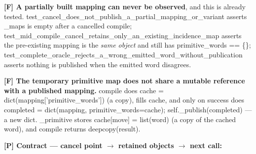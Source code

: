 \documentclass[10pt,a4paper]{article}
\begin{document}
\textbf{{[}F{]} A partially built mapping can never be observed}, and this is already tested. {\codefont test\_\allowbreak{}cancel\_\allowbreak{}does\_\allowbreak{}not\_\allowbreak{}publish\_\allowbreak{}a\_\allowbreak{}partial\_\allowbreak{}mapping\_\allowbreak{}or\_\allowbreak{}variant} asserts {\codefont \_\allowbreak{}maps} is empty after a cancelled compile; {\codefont test\_\allowbreak{}mid\_\allowbreak{}compile\_\allowbreak{}cancel\_\allowbreak{}retains\_\allowbreak{}only\_\allowbreak{}an\_\allowbreak{}existing\_\allowbreak{}incidence\_\allowbreak{}map} asserts the pre-existing mapping is the \emph{same object} and still has {\codefont primitive\_\allowbreak{}words == \{\}}; {\codefont test\_\allowbreak{}complete\_\allowbreak{}oracle\_\allowbreak{}rejects\_\allowbreak{}a\_\allowbreak{}wrong\_\allowbreak{}emitted\_\allowbreak{}word\_\allowbreak{}without\_\allowbreak{}publication} asserts nothing is published when the emitted word disagrees.

\textbf{{[}F{]} The temporary primitive map does not share a mutable reference with a published mapping.} {\codefont compile} does {\codefont cache = dict(ma\allowbreak{}pping['primitiv\allowbreak{}e\_\allowbreak{}words'])} (a copy), fills {\codefont cache}, and only on success does {\codefont completed = dic\allowbreak{}t(mapping,\allowbreak{} primitive\_\allowbreak{}words=cache); s\allowbreak{}elf.\allowbreak{}\_\allowbreak{}publish(complet\allowbreak{}ed)} --- a new dict. {\codefont \_\allowbreak{}primitive} stores {\codefont cache[move] = l\allowbreak{}ist(word)} (a copy of the cached word), and {\codefont compile} returns {\codefont deepcopy(result\allowbreak{})}.

\textbf{{[}P{]} Contract --- cancel point \(\rightarrow\) retained objects \(\rightarrow\) next call:}
\end{document}

